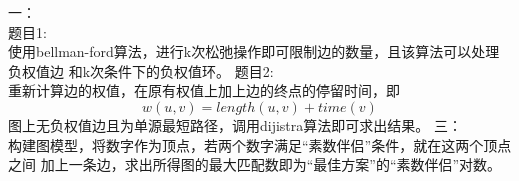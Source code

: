 \documentclass{article}
\begin{document}
一：\\
题目1:\\
使用bellman-ford算法，进行k次松弛操作即可限制边的数量，且该算法可以处理负权值边
和k次条件下的负权值环。
题目2:\\
重新计算边的权值，在原有权值上加上边的终点的停留时间，即
\[
w(u, v) = length(u, v) + time(v)
\]
图上无负权值边且为单源最短路径，调用dijistra算法即可求出结果。
\newpage
三：\\
构建图模型，将数字作为顶点，若两个数字满足“素数伴侣”条件，就在这两个顶点之间
加上一条边，求出所得图的最大匹配数即为“最佳方案”的“素数伴侣”对数。
\end{document}
